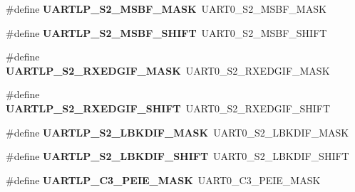 \begin{DoxyCompactItemize}
\#define {\bfseries U\+A\+R\+T\+L\+P\+\_\+\+S2\+\_\+\+M\+S\+B\+F\+\_\+\+M\+A\+SK}~U\+A\+R\+T0\+\_\+\+S2\+\_\+\+M\+S\+B\+F\+\_\+\+M\+A\+SK
\item 
\mbox{\label{group___backward___compatibility___symbols_ga2bfcba2957fb07036e3f1aaacebcfa1a}} 
\#define {\bfseries U\+A\+R\+T\+L\+P\+\_\+\+S2\+\_\+\+M\+S\+B\+F\+\_\+\+S\+H\+I\+FT}~U\+A\+R\+T0\+\_\+\+S2\+\_\+\+M\+S\+B\+F\+\_\+\+S\+H\+I\+FT
\item 
\mbox{\label{group___backward___compatibility___symbols_ga3ff5db6c0a297c27ffc6435304503f4d}} 
\#define {\bfseries U\+A\+R\+T\+L\+P\+\_\+\+S2\+\_\+\+R\+X\+E\+D\+G\+I\+F\+\_\+\+M\+A\+SK}~U\+A\+R\+T0\+\_\+\+S2\+\_\+\+R\+X\+E\+D\+G\+I\+F\+\_\+\+M\+A\+SK
\item 
\mbox{\label{group___backward___compatibility___symbols_gad414e0468b66c66ff2e90d1f8476c5fe}} 
\#define {\bfseries U\+A\+R\+T\+L\+P\+\_\+\+S2\+\_\+\+R\+X\+E\+D\+G\+I\+F\+\_\+\+S\+H\+I\+FT}~U\+A\+R\+T0\+\_\+\+S2\+\_\+\+R\+X\+E\+D\+G\+I\+F\+\_\+\+S\+H\+I\+FT
\item 
\mbox{\label{group___backward___compatibility___symbols_gaa43c6661dd27a409a7e7e17506c6bfde}} 
\#define {\bfseries U\+A\+R\+T\+L\+P\+\_\+\+S2\+\_\+\+L\+B\+K\+D\+I\+F\+\_\+\+M\+A\+SK}~U\+A\+R\+T0\+\_\+\+S2\+\_\+\+L\+B\+K\+D\+I\+F\+\_\+\+M\+A\+SK
\item 
\mbox{\label{group___backward___compatibility___symbols_ga82b6d0e62d2a3a3eeed35d124fb2b31c}} 
\#define {\bfseries U\+A\+R\+T\+L\+P\+\_\+\+S2\+\_\+\+L\+B\+K\+D\+I\+F\+\_\+\+S\+H\+I\+FT}~U\+A\+R\+T0\+\_\+\+S2\+\_\+\+L\+B\+K\+D\+I\+F\+\_\+\+S\+H\+I\+FT
\item 
\mbox{\label{group___backward___compatibility___symbols_ga4cc8bfb380818563bdfa2f98fbde7710}} 
\#define {\bfseries U\+A\+R\+T\+L\+P\+\_\+\+C3\+\_\+\+P\+E\+I\+E\+\_\+\+M\+A\+SK}~U\+A\+R\+T0\+\_\+\+C3\+\_\+\+P\+E\+I\+E\+\_\+\+M\+A\+SK
\item 
\mbox{\label{group___backward___compatibility___symbols_gacaf37722e62340c548104406df0bcc64}} 

\end{DoxyCompactItemize}
